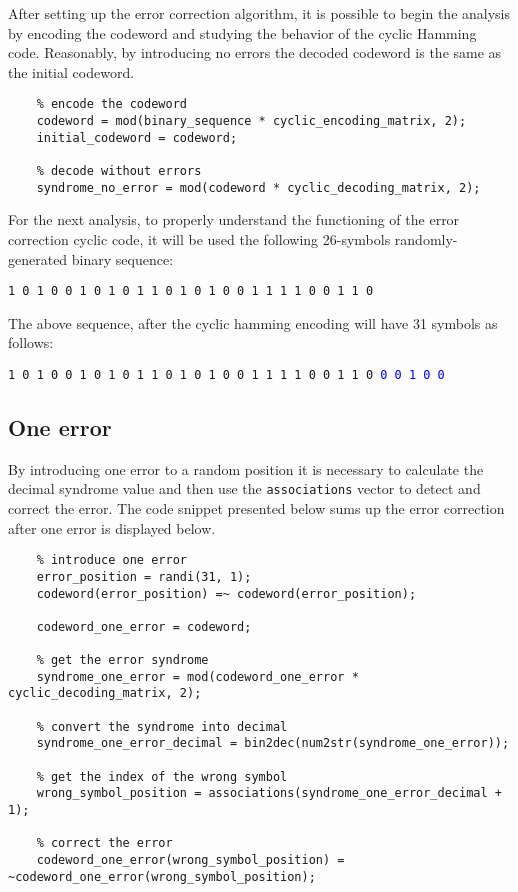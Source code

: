\noindent After setting up the error correction algorithm, it is possible to begin the analysis by encoding the codeword and studying the behavior of the cyclic Hamming code. Reasonably, by introducing no errors the decoded codeword is the same as the initial codeword.

\begin{lstlisting} 
    % encode the codeword
    codeword = mod(binary_sequence * cyclic_encoding_matrix, 2);
    initial_codeword = codeword;
    
    % decode without errors
    syndrome_no_error = mod(codeword * cyclic_decoding_matrix, 2);
\end{lstlisting}

\noindent For the next analysis, to properly understand the functioning of the error correction cyclic code, it will be used the following 26-symbols randomly-generated binary sequence:

\begin{center}
    \texttt{1 0 1 0 0 1 0 1 0 1 1 0 1 0 1 0 0 1 1 1 1 0 0 1 1 0}
\end{center}

\noindent The above sequence, after the cyclic hamming encoding will have 31 symbols as follows:
\begin{center}
    \texttt{1 0 1 0 0 1 0 1 0 1 1 0 1 0 1 0 0 1 1 1 1 0 0 1 1 0 }\textcolor{blue}{\texttt{0 0 1 0 0}}
\end{center}

\subsection{One error}
By introducing one error to a random position it is necessary to calculate the decimal syndrome value and then use the \texttt{associations} vector to detect and correct the error. The code snippet presented below sums up the error correction after one error is displayed below.

\begin{lstlisting}
    % introduce one error
    error_position = randi(31, 1);
    codeword(error_position) =~ codeword(error_position);

    codeword_one_error = codeword;

    % get the error syndrome
    syndrome_one_error = mod(codeword_one_error * cyclic_decoding_matrix, 2);

    % convert the syndrome into decimal
    syndrome_one_error_decimal = bin2dec(num2str(syndrome_one_error));

    % get the index of the wrong symbol
    wrong_symbol_position = associations(syndrome_one_error_decimal + 1);

    % correct the error
    codeword_one_error(wrong_symbol_position) = ~codeword_one_error(wrong_symbol_position);
\end{lstlisting}

